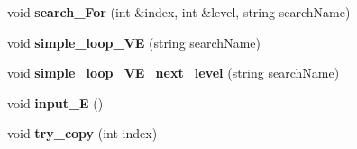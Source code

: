 \begin{DoxyCompactItemize}
\item 
void {\bfseries search\+\_\+\+For} (int \&index, int \&level, string search\+Name)\hypertarget{classE_ad503603d414470a274f75947e8d2f3e2}{}\label{classE_ad503603d414470a274f75947e8d2f3e2}

\item 
void {\bfseries simple\+\_\+loop\+\_\+\+VE} (string search\+Name)\hypertarget{classE_ada9d8f802419ec518f0fa39402cbfa77}{}\label{classE_ada9d8f802419ec518f0fa39402cbfa77}

\item 
void {\bfseries simple\+\_\+loop\+\_\+\+V\+E\+\_\+next\+\_\+level} (string search\+Name)\hypertarget{classE_a0838d3308c57674812e7d17d513865a0}{}\label{classE_a0838d3308c57674812e7d17d513865a0}

\item 
void {\bfseries input\+\_\+E} ()\hypertarget{classE_a8dea7f1657ac1ff4ea48f183d075a980}{}\label{classE_a8dea7f1657ac1ff4ea48f183d075a980}

\item 
void {\bfseries try\+\_\+copy} (int index)\hypertarget{classE_a8f77025cfbc6d235b77c0516de92a553}{}\label{classE_a8f77025cfbc6d235b77c0516de92a553}


\end{DoxyCompactItemize}
